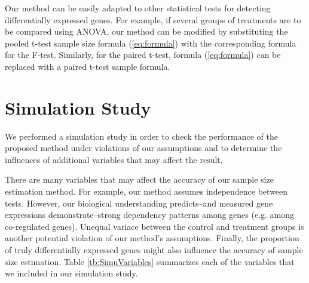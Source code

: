 \documentclass{bioinfo}
\begin{document}
Our method can be easily adapted to other statistical tests for
detecting differentially expressed genes. For example, if several
groups of treatments are to be compared using ANOVA, our method can
be modified by substituting the pooled t-test sample size formula
(\ref{eq:formula}) with the corresponding formula for the
F-test. Similarly, for the paired t-test, formula (\ref{eq:formula})
can be replaced with a paired t-test sample formula.


\section{Simulation Study}

We performed a simulation study in order to check the performance of
the proposed method under violations of our assumptions and to
determine the influences of additional variables that may affect the
result.

There are many variables that may affect the accuracy of our sample
size estimation method. For example, our method assumes independence
between tests. However, our biological understanding predicts--and
measured gene expressions demonstrate--strong dependency patterns
among genes (e.g. among co-regulated genes).  Unequal variace
between the control and treatment groups is another potential
violation of our method's assumptions. Finally, the proportion of
truly differentially expressed genes might also influence the
accuracy of sample size estimation.  Table \ref{tb:SimuVariables}
summarizes each of the variables that we included in our simulation
study.
\end{document}
